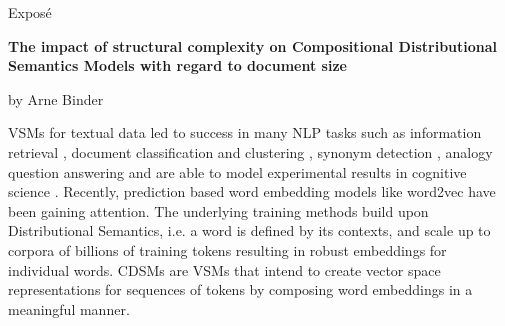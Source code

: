 
\begin{center}
	\huge{Expos\'e} 
	\vspace{0.5cm}
	 
	\large{\bf{The impact of structural complexity on Compositional Distributional Semantics Models %
			with regard to document size}} 
	\vspace{0.5cm}

	by Arne Binder \\
\end{center}

\vspace{0.5cm}
\normalsize

\acfp{VSM} for textual data \autocite{salton_vector_1975} led to success in many \ac{NLP} tasks %
such as information retrieval \autocite{dierk_smart_1971,deerwester_indexing_1990}, document classification and clustering , synonym detection \autocite{rapp_word_2003}, analogy question answering \autocite{turney_similarity_2006} and are able to model experimental results in cognitive science \autocite{landauer_solution_1997,mcdonald_testing_2001}.
Recently, prediction based word embedding models like word2vec \autocite{mikolov_efficient_2013} have been gaining attention.%
The underlying training methods build upon Distributional Semantics, i.e. a word is defined by its contexts, and scale up to %
corpora of billions of training tokens \autocite{mikolov_distributed_2013} resulting in robust embeddings for individual words. 
\acfp{CDSM} are \acp{VSM} that intend to create vector space representations for sequences of tokens by composing word embeddings in a meaningful manner. 

